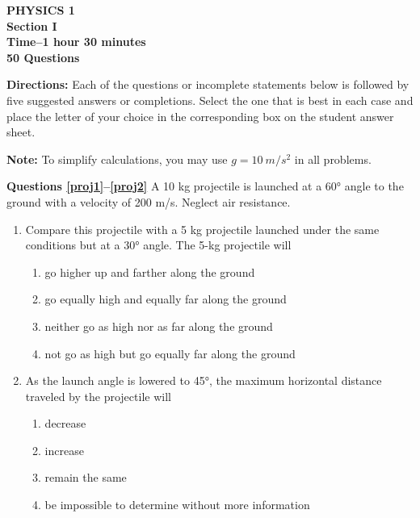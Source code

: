 \documentclass[11pt]{article}
\begin{document}
\begin{center}
  \textbf{PHYSICS 1\\
    Section I\\
    Time--1 hour 30 minutes\\
    50 Questions
  }
\end{center}

\textbf{Directions:} Each of the questions or incomplete statements below is
followed by five suggested answers or completions. Select the one that is best
in each case and place the letter of your choice in the corresponding box on
the student answer sheet.

\vspace{10pt}
\textbf{Note:} To simplify calculations, you may use $g=\SI{10}{m/s^2}$ in all
problems.

\raggedcolumns
\begin{multicols}{2}
  \textbf{Questions \ref{proj1}--\ref{proj2}} A 10 kg projectile is launched at
  a \ang{60} angle to the ground with a velocity of 200 m/s. Neglect air
  resistance.
  \begin{enumerate}[leftmargin=18pt]
  \item Compare this projectile with a 5 kg projectile launched under the same
    conditions but at a \ang{30} angle. The 5-kg projectile will
    \label{proj1}
    \begin{enumerate}[nosep,leftmargin=18pt,label=(\Alph*)]
    \item go higher up and farther along the ground
    \item go equally high and equally far along the ground
    \item neither go as high nor as far along the ground
    \item not go as high but go equally far along the ground
    \end{enumerate}
    \vspace{.7in}
    
  \item As the launch angle is lowered to \ang{45}, the maximum horizontal
    distance traveled by the projectile will
    \label{proj2}
    \begin{enumerate}[nosep,leftmargin=18pt,label=(\Alph*)]
    \item decrease
    \item increase
    \item remain the same
    \item be impossible to determine without more information
    \end{enumerate}
    \vspace{.7in}
    

\end{enumerate}
\end{multicols}
\end{document}
